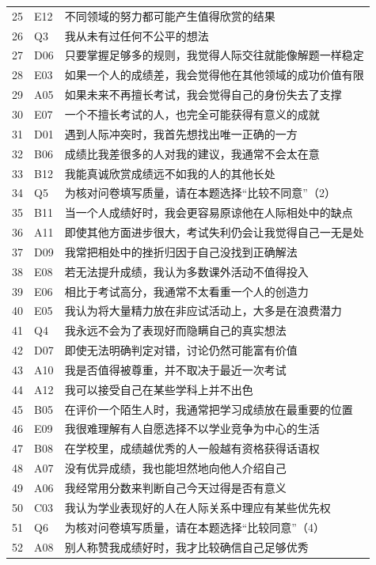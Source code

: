 \documentclass[11pt,a4paper,UTF8,fontset=none]{ctexart}
\begin{document}
\begin{longtable}{p{0.9cm}p{1.2cm}p{11.1cm}}
25&E12&不同领域的努力都可能产生值得欣赏的结果\\
26&Q3&我从未有过任何不公平的想法\\
27&D06&只要掌握足够多的规则，我觉得人际交往就能像解题一样稳定\\
28&E03&如果一个人的成绩差，我会觉得他在其他领域的成功价值有限\\
29&A05&如果未来不再擅长考试，我会觉得自己的身份失去了支撑\\
30&E07&一个不擅长考试的人，也完全可能获得有意义的成就\\
31&D01&遇到人际冲突时，我首先想找出唯一正确的一方\\
32&B06&成绩比我差很多的人对我的建议，我通常不会太在意\\
33&B12&我能真诚欣赏成绩远不如我的人的其他长处\\
34&Q5&为核对问卷填写质量，请在本题选择“比较不同意”（2）\\
35&B11&当一个人成绩好时，我会更容易原谅他在人际相处中的缺点\\
36&A11&即使其他方面进步很大，考试失利仍会让我觉得自己一无是处\\
37&D09&我常把相处中的挫折归因于自己没找到正确解法\\
38&E08&若无法提升成绩，我认为多数课外活动不值得投入\\
39&E06&相比于考试高分，我通常不太看重一个人的创造力\\
40&E05&我认为将大量精力放在非应试活动上，大多是在浪费潜力\\
41&Q4&我永远不会为了表现好而隐瞒自己的真实想法\\
42&D07&即使无法明确判定对错，讨论仍然可能富有价值\\
43&A10&我是否值得被尊重，并不取决于最近一次考试\\
44&A12&我可以接受自己在某些学科上并不出色\\
45&B05&在评价一个陌生人时，我通常把学习成绩放在最重要的位置\\
46&E09&我很难理解有人自愿选择不以学业竞争为中心的生活\\
47&B08&在学校里，成绩越优秀的人一般越有资格获得话语权\\
48&A07&没有优异成绩，我也能坦然地向他人介绍自己\\
49&A06&我经常用分数来判断自己今天过得是否有意义\\
50&C03&我认为学业表现好的人在人际关系中理应有某些优先权\\
51&Q6&为核对问卷填写质量，请在本题选择“比较同意”（4）\\
52&A08&别人称赞我成绩好时，我才比较确信自己足够优秀\\

\end{longtable}
\end{document}
